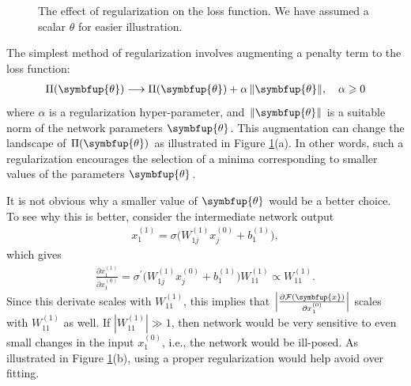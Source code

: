 \documentclass[11pt]{extarticle}
\newcommand{\ds}{\displaystyle}
\newcommand{\vx}{\symbfup{x}}
\theoremstyle{definition}
\newcommand{\btheta}{\symbfup{\theta}}
\newcommand{\df}[2]{\frac{\partial #1}{\partial #2}}
\begin{document}
\begin{figure}[htbp!]
\begin{center}
\caption{The effect of regularization on the loss function. We have assumed a scalar $\theta$ for easier illustration.}
\label{fig:reg}
\end{center}
\end{figure}

The simplest method of regularization involves augmenting a penalty term to the loss function:
\begin{align*}
  \Pi(\btheta) \longrightarrow \Pi(\btheta) + \alpha\,\|\btheta\|, \quad \alpha \geqslant 0
\end{align*}
where $\alpha$ is a regularization hyper-parameter, and $\|\btheta\|$ is a suitable norm of the network parameters $\btheta$. This augmentation can change the landscape of $\Pi(\btheta)$ as illustrated in Figure \ref{fig:reg}(a). In other words, such a regularization encourages the selection of a minima corresponding to smaller values of the parameters $\btheta$. 

It is not obvious why a smaller value of $\btheta$ would be a better choice. To see why this is better, consider the intermediate network output
\begin{align*}
  x_1^{(1)} = \sigma\big(W_{1j}^{(1)} x_j^{(0)} + b^{(1)}_1\big),
\end{align*}
which gives
\begin{align*}
\df{x_1^{(1)}}{x_1^{(0)}} = \sigma^\prime\big(W_{1j}^{(1)} x_j^{(0)} + b^{(1)}_1\big) W_{11}^{(1)}  \propto W_{11}^{(1)}.
\end{align*}
Since this derivate scales with $W_{11}^{(1)}$, this implies that $\Big|\df{\mathcal{F}(\vx)}{x_1^{(0)}}\Big|$ scales with $W_{11}^{(1)}$ as well. If $\ds|W_{11}^{(1)}|\gg 1$, then network would be very sensitive to even small changes in the input $x_1^{(0)}$, i.e., the network would be ill-posed. As illustrated in Figure \ref{fig:reg}(b), using a proper regularization would help avoid over fitting.
\end{document}

